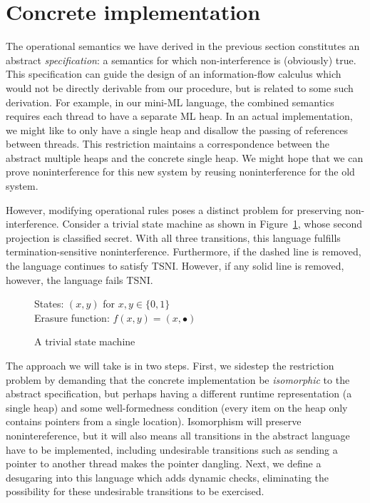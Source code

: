 \section{Concrete implementation}
\label{sec:concrete}

The operational semantics we have derived in the previous section
constitutes an abstract \emph{specification}: a semantics for which
non-interference is (obviously) true.  This specification can guide the
design of an information-flow calculus which would not be directly
derivable from our procedure, but is related to some such derivation.
For example, in our mini-ML language, the combined semantics requires
each thread to have a separate ML heap.  In an actual implementation, we
might like to only have a single heap and disallow the passing of
references between threads.  This restriction maintains a correspondence
between the abstract multiple heaps and the concrete single heap.  We might
hope that we can prove noninterference for this new system by reusing
noninterference for the old system.

However, modifying operational rules poses a distinct problem for
preserving non-interference.  Consider a trivial state machine as shown
in Figure~\ref{fig:trivial-sm}, whose second projection is classified
secret.  With all three transitions, this language fulfills
termination-sensitive noninterference.  Furthermore, if the dashed line
is removed, the language continues to satisfy TSNI.  However, if any
solid line is removed, however, the language fails TSNI.

\begin{figure}
    States: $(x,y)$ for $x,y \in \{0,1\}$ \\
    Erasure function: $f(x,y) = (x,\bullet)$

    \begin{center}\end{center}

    \label{fig:trivial-sm}
    \caption{A trivial state machine}
\end{figure}

The approach we will take is in two steps.  First, we sidestep the
restriction problem by demanding that the concrete implementation be
\emph{isomorphic} to the abstract specification, but perhaps having a different
runtime representation (a single heap) and some well-formedness
condition (every item on the heap only contains pointers from a single
location).  Isomorphism will preserve nonintereference, but it will also means all
transitions in the abstract language have to be implemented, including
undesirable transitions such as sending a pointer to another thread makes
the pointer dangling.  Next, we define a desugaring into this language
which adds dynamic checks, eliminating the possibility for these undesirable
transitions to be exercised.

